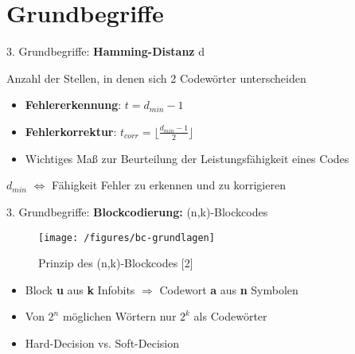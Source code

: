\documentclass[ngerman]{beamer}
\begin{document}
\section{Grundbegriffe}
\begin{frame}{3. Grundbegriffe: \textbf{Hamming-Distanz} d}

	Anzahl der Stellen, in denen sich 2 Codewörter \alert{unterscheiden}\newline

	\begin{itemize}
	\item \textbf{Fehlererkennung}: $t = d_{min} - 1$\newline
	\item \textbf{Fehlerkorrektur}: $t_{corr} =\lfloor \frac{d_{min} - 1}{2} \rfloor$\newline
	\item  Wichtiges Maß zur Beurteilung der \alert{Leistungsfähigkeit} eines Codes
	\end{itemize}
	 $d_{min}$ $\Leftrightarrow$ Fähigkeit Fehler zu erkennen und zu korrigieren\newline

\end{frame}


\begin{frame}{3. Grundbegriffe: \textbf{Blockcodierung: }(n,k)-Blockcodes}
	\begin{figure}[htbp]
 		\texttt{[image: /figures/bc-grundlagen]}
 			\caption{Prinzip des (n,k)-Blockcodes [2]}
	\end{figure}

	\begin{itemize}
	\item Block \textbf{u} aus \textbf{k} Infobits $\Rightarrow$ Codewort \textbf{a} aus \textbf{n} Symbolen
	\item Von $2^n$ möglichen Wörtern nur $2^k$ als Codewörter
	\item \alert{Hard-Decision} vs. Soft-Decision
	\end{itemize}


\end{frame}
\end{document}
